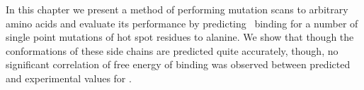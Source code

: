 In this chapter we present a method of performing mutation scans to arbitrary amino acids and evaluate its performance by predicting \ddg\ binding for a number of single point mutations of hot spot residues to alanine.
We show that though the conformations of these side chains are predicted quite accurately, though, no significant correlation of free energy of binding was observed between predicted and experimental values for \ddg.



